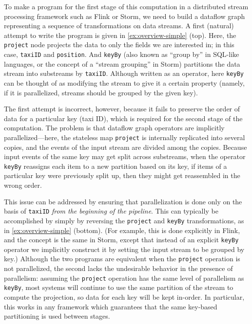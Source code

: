 To make a program for the first stage of this computation in a distributed stream processing framework such as Flink or Storm, we need to build a dataflow graph representing a sequence of transformations on data streams. A first (natural) attempt to write the program is given in \cref{ex:overview-simple} (top). Here, the \texttt{project} node projects the data to only the fields we are interested in; in this case, \texttt{taxiID} and \texttt{position}. And \texttt{keyBy} (also known as ``group by'' in SQL-like languages, or the concept of a ``stream grouping'' in Storm) partitions the data stream into substreams by \texttt{taxiID}.
Although written as an operator, here \texttt{keyBy} can be thought of as modifying the stream to give it a certain property (namely, if it is parallelized, streams should be grouped by the given key).

The first attempt is incorrect, however, because it fails to preserve
the order of data for a particular key (taxi ID), which is required
for the second stage of the computation. The problem is that dataflow
graph operators are implicitly parallelized---here, the stateless map
\texttt{project} is internally replicated into several copies, and the
events of the input stream are divided among the copies.
Because input events of the same key may get split across substreams,
when the operator \texttt{keyBy} reassigns each item to a new
partition based on its key, if items of a particular key were
previously split up, then they might get reassembled in the wrong
order.

This issue can be addressed by ensuring that parallelization is done only on the basis of \texttt{taxiID} \emph{from the beginning of the pipeline}.
This can typically be accomplished by simply by reversing the \texttt{project} and \texttt{keyBy} transformations, as in \cref{ex:overview-simple} (bottom).
(For example, this is done explicitly in Flink, and the concept is the same in Storm, except that instead of an explicit \texttt{keyBy} operator we implicitly construct it by setting the input stream to be grouped by key.)
Although the two programs are equivalent when the \texttt{project} operation is not parallelized, the second lacks the undesirable behavior in the presence of parallelism: assuming the \texttt{project} operation has the same level of parallelism as \texttt{keyBy}, most systems will continue to use the same partition of the stream to compute the projection, so data for each key will be kept in-order. In particular, this works in any framework which guarantees that the same key-based partitioning is used between stages.

